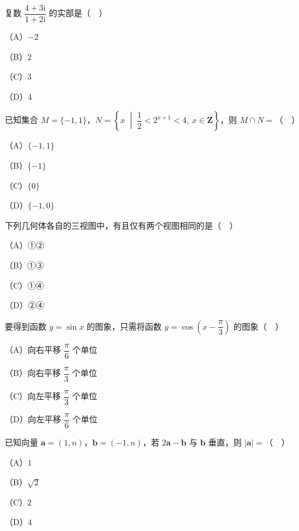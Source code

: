 


\begin{question}
复数 $\dfrac{4+3\mathrm i}{1+2\mathrm i}$ 的实部是（　）

（A）$-2$

（B）$2$

（C）$3$

（D）$4$

\end{question}
\begin{question}
已知集合 $M=\{-1,1\}$，$N=\left\{x\;\middle|\;\dfrac12<2^{x+1}<4,\ x\in\mathbf Z\right\}$，则 $M\cap N=$（　）

（A）$\{-1,1\}$

（B）$\{-1\}$

（C）$\{0\}$

（D）$\{-1,0\}$

\Needspace{0.4\textheight}
\end{question}
\begin{question}
下列几何体各自的三视图中，有且仅有两个视图相同的是（　）
\nopagebreak[4]
\begin{center}\end{center}
\nopagebreak[4]
（A）①②

（B）①③

（C）①④

（D）②④

\end{question}
\begin{question}
要得到函数 $y=\sin x$ 的图象，只需将函数 $y=\cos\left(x-\dfrac{\pi}{3}\right)$ 的图象（　）

（A）向右平移 $\dfrac{\pi}{6}$ 个单位

（B）向右平移 $\dfrac{\pi}{3}$ 个单位

（C）向左平移 $\dfrac{\pi}{3}$ 个单位

（D）向左平移 $\dfrac{\pi}{6}$ 个单位

\end{question}
\begin{question}
已知向量 $\boldsymbol a=(1,n)$，$\boldsymbol b=(-1,n)$，若 $2\boldsymbol a-\boldsymbol b$ 与 $\boldsymbol b$ 垂直，则 $|\boldsymbol a|=$（　）

（A）$1$

（B）$\sqrt2$

（C）$2$

（D）$4$

\end{question}
